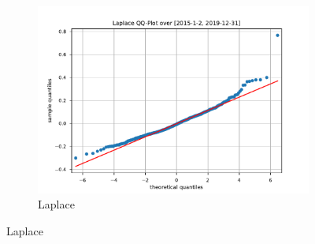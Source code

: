 \begin{figure}[htbp]
\begin{subfigure}[b]{0.32\textwidth}
        \includegraphics[width=\textwidth]{content/reschap4/Figures/laplace_QQ_2015-1-2-2019-12-31.pdf}
        \caption{\small Laplace}
    \end{subfigure}


\end{figure}
